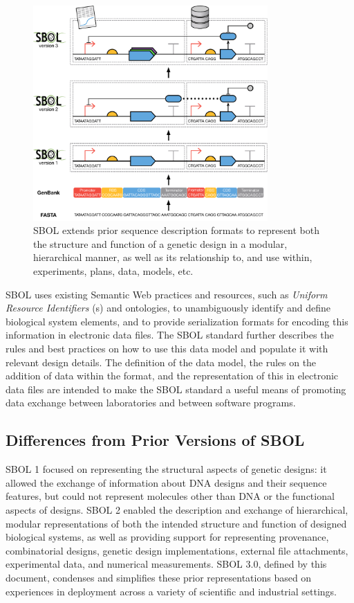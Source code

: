 \begin{figure}[htbp!]
\centering
\includegraphics[width=0.8\textwidth]{images/SBOL3-evolution.pdf}
\caption{SBOL extends prior sequence description formats to represent both the structure and function of a genetic design in a modular, hierarchical manner, as well as its relationship to, and use within, experiments, plans, data, models, etc.}
\label{f:sequence}
\end{figure}

SBOL uses existing Semantic Web practices and resources, such as \emph{Uniform Resource Identifiers} (s) and ontologies, to unambiguously identify and define biological system elements,
and to provide serialization formats for encoding this information in electronic data files.
The SBOL standard further describes the rules and best practices on how to use this data model and populate it with relevant design details.
The definition of the data model, the rules on the addition of data within the format, and the representation of this in electronic data files are intended to make the SBOL standard a useful means of promoting data exchange between laboratories and between software programs.

\subsection*{Differences from Prior Versions of SBOL}

SBOL 1 focused on representing the structural aspects of genetic designs: it allowed the exchange of information about DNA designs and their sequence features, but could not represent molecules other than DNA or the functional aspects of designs. SBOL 2 enabled the description and exchange of hierarchical, modular representations of both the intended structure and function of designed biological systems, as well as providing support for representing provenance, combinatorial designs, genetic design implementations, external file attachments, experimental data, and numerical measurements.
SBOL 3.0, defined by this document, condenses and simplifies these prior representations based on experiences in deployment across a variety of scientific and industrial settings.

